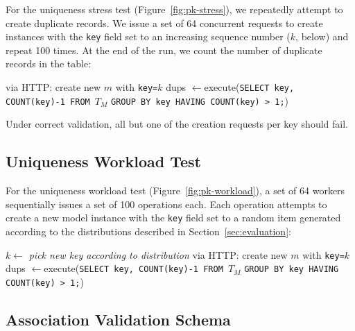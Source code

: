 For the uniqueness stress test (Figure~\ref{fig:pk-stress}), we repeatedly attempt to create duplicate records. We issue a set of 64 concurrent requests to create instances with the \texttt{key} field set to an increasing sequence number ($k$, below) and repeat 100 times. At the end of the run, we count the number of duplicate records in the table:

\begin{algorithm}[H]
\begin{algorithmic}
      \State via HTTP: create new $m$ with \texttt{key=$k$}
     \EndParFor
   \EndFor
   \State dups $\gets $execute(\texttt{SELECT key, COUNT(key)-1 FROM $T_M$}
   \State \hspace{6.5em}\texttt{GROUP BY key HAVING COUNT(key) > 1;})
\EndFor
\end{algorithmic}
\end{algorithm}

Under correct validation, all but one of the creation requests per key should fail.

\subsection{Uniqueness Workload Test}
\label{sec:appendix-uniqueness-workload}

For the uniqueness workload test (Figure~\ref{fig:pk-workload}), a set of 64 workers sequentially issues a set of 100 operations each. Each operation attempts to create a new model instance with the \texttt{key} field set to a random item generated according to the distributions described in Section~\ref{sec:evaluation}:

\begin{algorithm}[H]
\begin{algorithmic}
      \State $k \gets$ \textit{pick new key according to distribution}
      \State via HTTP: create new $m$ with \texttt{key=$k$}
     \EndFor
   \EndParFor
   \State dups $\gets $execute(\texttt{SELECT key, COUNT(key)-1 FROM $T_M$}
   \State \hspace{6.5em}\texttt{GROUP BY key HAVING COUNT(key) > 1;})
\EndFor
\end{algorithmic}
\end{algorithm}

\subsection{Association Validation Schema}
\label{sec:appendix-association-schema}

